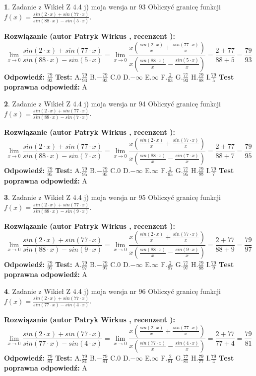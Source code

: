 \documentclass[12pt, a4paper]{article}
\theoremstyle{definition} %
\newtheorem{zad}{}
\newcommand{\zadStart}[1]{\begin{zad}#1\newline}
\newcommand{\zadStop}{\end{zad}}
\newcommand{\rozwStart}[2]{\noindent \textbf{Rozwiązanie (autor #1 , recenzent #2): }\newline}
\newcommand{\rozwStop}{\newline}
\newcommand{\odpStart}{\noindent \textbf{Odpowiedź:}\newline}
\newcommand{\odpStop}{\newline}
\newcommand{\testStart}{\noindent \textbf{Test:}\newline}
\newcommand{\testStop}{\newline}
\newcommand{\kluczStart}{\noindent \textbf{Test poprawna odpowiedź:}\newline}
\newcommand{\kluczStop}{\newline}
\begin{document}
\zadStart{Zadanie z Wikieł Z 4.4 j) moja wersja nr 93}
Obliczyć granicę funkcji $f(x)=\frac{sin(2\cdot x) +sin(77\cdot x)}{sin(88\cdot x) -sin(5\cdot x)}$.
\zadStop
\rozwStart{Patryk Wirkus}{}
$$\lim\limits_{x\to 0}\frac{sin(2\cdot x) +sin(77\cdot x)}{sin(88\cdot x) -sin(5\cdot x)}=\lim\limits_{x\to 0}\frac{x(\frac{sin(2\cdot x)}{x}+\frac{sin(77\cdot x)}{x})}{x(\frac{sin(88\cdot x)}{x}-\frac{sin(5\cdot x)}{x})}=\frac{2+77}{88+5} = \frac{79}{93}$$
\rozwStop
\odpStart
$\frac{79}{93}$
\odpStop
\testStart
A.$\frac{79}{93}$
B.$-\frac{79}{93}$
C.$0$
D.$-\infty$
E.$\infty$
F.$\frac{2}{93}$
G.$\frac{77}{93}$
H.$\frac{79}{88}$
I.$\frac{79}{5}$
\testStop
\kluczStart
A
\kluczStop



\zadStart{Zadanie z Wikieł Z 4.4 j) moja wersja nr 94}
Obliczyć granicę funkcji $f(x)=\frac{sin(2\cdot x) +sin(77\cdot x)}{sin(88\cdot x) -sin(7\cdot x)}$.
\zadStop
\rozwStart{Patryk Wirkus}{}
$$\lim\limits_{x\to 0}\frac{sin(2\cdot x) +sin(77\cdot x)}{sin(88\cdot x) -sin(7\cdot x)}=\lim\limits_{x\to 0}\frac{x(\frac{sin(2\cdot x)}{x}+\frac{sin(77\cdot x)}{x})}{x(\frac{sin(88\cdot x)}{x}-\frac{sin(7\cdot x)}{x})}=\frac{2+77}{88+7} = \frac{79}{95}$$
\rozwStop
\odpStart
$\frac{79}{95}$
\odpStop
\testStart
A.$\frac{79}{95}$
B.$-\frac{79}{95}$
C.$0$
D.$-\infty$
E.$\infty$
F.$\frac{2}{95}$
G.$\frac{77}{95}$
H.$\frac{79}{88}$
I.$\frac{79}{7}$
\testStop
\kluczStart
A
\kluczStop



\zadStart{Zadanie z Wikieł Z 4.4 j) moja wersja nr 95}
Obliczyć granicę funkcji $f(x)=\frac{sin(2\cdot x) +sin(77\cdot x)}{sin(88\cdot x) -sin(9\cdot x)}$.
\zadStop
\rozwStart{Patryk Wirkus}{}
$$\lim\limits_{x\to 0}\frac{sin(2\cdot x) +sin(77\cdot x)}{sin(88\cdot x) -sin(9\cdot x)}=\lim\limits_{x\to 0}\frac{x(\frac{sin(2\cdot x)}{x}+\frac{sin(77\cdot x)}{x})}{x(\frac{sin(88\cdot x)}{x}-\frac{sin(9\cdot x)}{x})}=\frac{2+77}{88+9} = \frac{79}{97}$$
\rozwStop
\odpStart
$\frac{79}{97}$
\odpStop
\testStart
A.$\frac{79}{97}$
B.$-\frac{79}{97}$
C.$0$
D.$-\infty$
E.$\infty$
F.$\frac{2}{97}$
G.$\frac{77}{97}$
H.$\frac{79}{88}$
I.$\frac{79}{9}$
\testStop
\kluczStart
A
\kluczStop



\zadStart{Zadanie z Wikieł Z 4.4 j) moja wersja nr 96}
Obliczyć granicę funkcji $f(x)=\frac{sin(2\cdot x) +sin(77\cdot x)}{sin(77\cdot x) -sin(4\cdot x)}$.
\zadStop
\rozwStart{Patryk Wirkus}{}
$$\lim\limits_{x\to 0}\frac{sin(2\cdot x) +sin(77\cdot x)}{sin(77\cdot x) -sin(4\cdot x)}=\lim\limits_{x\to 0}\frac{x(\frac{sin(2\cdot x)}{x}+\frac{sin(77\cdot x)}{x})}{x(\frac{sin(77\cdot x)}{x}-\frac{sin(4\cdot x)}{x})}=\frac{2+77}{77+4} = \frac{79}{81}$$
\rozwStop
\odpStart
$\frac{79}{81}$
\odpStop
\testStart
A.$\frac{79}{81}$
B.$-\frac{79}{81}$
C.$0$
D.$-\infty$
E.$\infty$
F.$\frac{2}{81}$
G.$\frac{77}{81}$
H.$\frac{79}{77}$
I.$\frac{79}{4}$
\testStop
\kluczStart
A
\kluczStop
\end{document}
